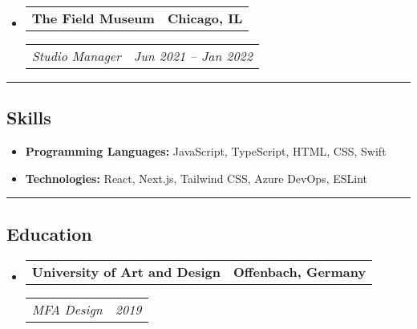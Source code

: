 \documentclass[11pt,letterpaper]{article}
\makeatletter
\newcommand{\headerrow}[2]
{\begin{tabular*}{\linewidth}{l@{\extracolsep{\fill}}r}
#1 &
#2 \\
\end{tabular*}}
\makeatother
\begin{document}
\begin{itemize}[leftmargin=1em]
	\item
	      \headerrow
	      {\textbf{The Field Museum}}
	      {\textbf{Chicago, IL}}
	      \headerrow
	      {\emph{Studio Manager}}
	      {\emph{Jun 2021 -- Jan 2022}}
	      	      
\end{itemize}
\vspace{1em} %
%
%
\hrule
\vspace{-1em}
\subsection*{\Large Skills}

\begin{itemize}[leftmargin=1em,noitemsep]
	\item \textbf{Programming Languages:}
	      JavaScript, TypeScript, HTML, CSS, Swift
	\item \textbf{Technologies:}
	      React, Next.js, Tailwind CSS, Azure DevOps, ESLint
\end{itemize}
\vspace{1em} %
%
%
\hrule
\vspace{-1em}
\subsection*{\Large Education}

\begin{itemize}[leftmargin=1em]
	\parskip=0.1em
		
	\item
	      \headerrow
	      {\textbf{University of Art and Design}}
	      {\textbf{Offenbach, Germany}}
	      \headerrow
	      {\emph{MFA Design}}
	      {\emph{2019}}
	      
	      	      
\end{itemize}
\end{document}

